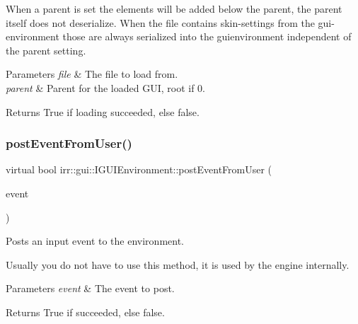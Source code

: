 When a parent is set the elements will be added below the parent, the parent itself does not deserialize. When the file contains skin-\/settings from the gui-\/environment those are always serialized into the guienvironment independent of the parent setting. 
\begin{DoxyParams}{Parameters}
{\em file} & The file to load from. \\
\hline
{\em parent} & Parent for the loaded G\+UI, root if 0. \\
\hline
\end{DoxyParams}
\begin{DoxyReturn}{Returns}
True if loading succeeded, else false. 
\end{DoxyReturn}
\mbox{\label{classirr_1_1gui_1_1IGUIEnvironment_aff1cc1109841f9bccd19634870c7cd65}} 
\subsubsection{\texorpdfstring{post\+Event\+From\+User()}{postEventFromUser()}\hspace{0.1cm}{\footnotesize\ttfamily [1/2]}}
{\footnotesize\ttfamily virtual bool irr\+::gui\+::\+I\+G\+U\+I\+Environment\+::post\+Event\+From\+User (\begin{DoxyParamCaption}\item[{const \hyperlink{structirr_1_1SEvent}{S\+Event} \&}]{event }\end{DoxyParamCaption})\hspace{0.3cm}{\ttfamily [pure virtual]}}



Posts an input event to the environment. 

Usually you do not have to use this method, it is used by the engine internally. 
\begin{DoxyParams}{Parameters}
{\em event} & The event to post. \\
\hline
\end{DoxyParams}
\begin{DoxyReturn}{Returns}
True if succeeded, else false. 
\end{DoxyReturn}
\mbox{\label{classirr_1_1gui_1_1IGUIEnvironment_aff1cc1109841f9bccd19634870c7cd65}} 
